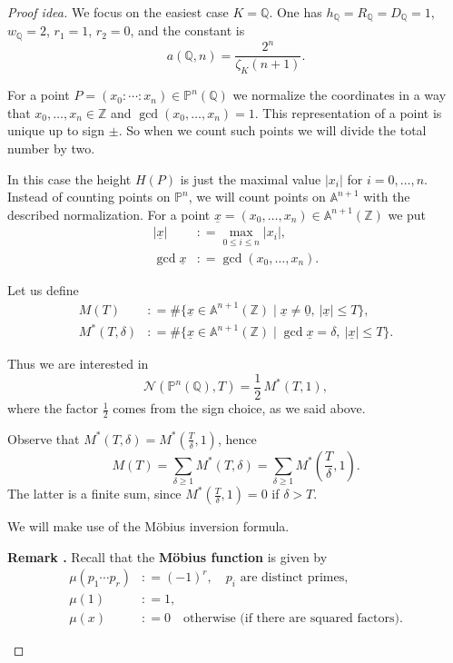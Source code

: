 \documentclass{article}
\theoremstyle{definition}
\newcommand{\term}{\textbf}
\newcommand{\dfn}{\mathrel{\mathop:}=}
\newcommand{\ZZ}{\mathbb{Z}}
\newcommand{\QQ}{\mathbb{Q}}
\newcommand{\PP}{\mathbb{P}}
\renewcommand{\AA}{\mathbb{A}}
\newenvironment{remark}
{ \begin{shaded}\begingroup\small\noindent\refstepcounter{proposition}\textbf{Remark \theproposition.} }
{ \endgroup\end{shaded} }
\begin{document}
\begin{proof}[Proof idea]
  We focus on the easiest case $K = \QQ$. One has $h_\QQ = R_\QQ = D_\QQ = 1$,
  $w_\QQ = 2$, $r_1 = 1$, $r_2 = 0$, and the constant is
  $$a (\QQ,n) = \frac{2^n}{\zeta_K (n+1)}.$$

  For a point $P = (x_0 : \cdots : x_n) \in \PP^n (\QQ)$ we normalize the
  coordinates in a way that $x_0, \ldots, x_n \in \ZZ$ and
  $\gcd (x_0,\ldots,x_n) = 1$. This representation of a point is unique up to
  sign $\pm$. So when we count such points we will divide the total number by
  two.

  In this case the height $H (P)$ is just the maximal value $|x_i|$ for
  $i = 0, \ldots, n$. Instead of counting points on $\PP^n$, we will count
  points on $\AA^{n+1}$ with the described normalization. For a point
  $\underline{x} = (x_0, \ldots, x_n) \in \AA^{n+1} (\ZZ)$ we put
  \begin{align*}
    |\underline{x}| & \dfn \max_{0 \le i \le n} |x_i|,\\
    \gcd \underline{x} & \dfn \gcd (x_0,\ldots,x_n).
  \end{align*}

  Let us define
  \begin{align*}
    M (T) & \dfn \# \{ \underline{x} \in \AA^{n+1} (\ZZ) \mid \underline{x} \ne \underline{0}, ~ |\underline{x}| \le T \},\\
    M^* (T,\delta) & \dfn \# \{ \underline{x} \in \AA^{n+1} (\ZZ) \mid \gcd \underline{x} = \delta, ~ |\underline{x}| \le T \}.
  \end{align*}

  Thus we are interested in
  $$\mathcal{N} (\PP^n (\QQ), T) = \frac{1}{2} \, M^* (T,1),$$
  where the factor $\frac{1}{2}$ comes from the sign choice, as we said above.

  Observe that $M^* (T,\delta) = M^* (\frac{T}{\delta},1)$, hence
  $$M (T) = \sum_{\delta\ge 1} M^* (T,\delta) = \sum_{\delta\ge 1} M^* \left(\frac{T}{\delta},1\right).$$
  The latter is a finite sum, since $M^* (\frac{T}{\delta},1) = 0$ if
  $\delta > T$.

  We will make use of the M\"obius inversion formula.

  \begin{remark}
    Recall that the \term{M\"obius function} is given by
    \begin{align*}
      \mu (p_1\cdots p_r) & \dfn (-1)^r, \quad p_i\text{ are distinct primes},\\
      \mu (1) & \dfn 1,\\
      \mu (x) & \dfn 0 \quad \text{otherwise (if there are squared factors)}.
    \end{align*}


\end{remark}
\end{proof}
\end{document}
